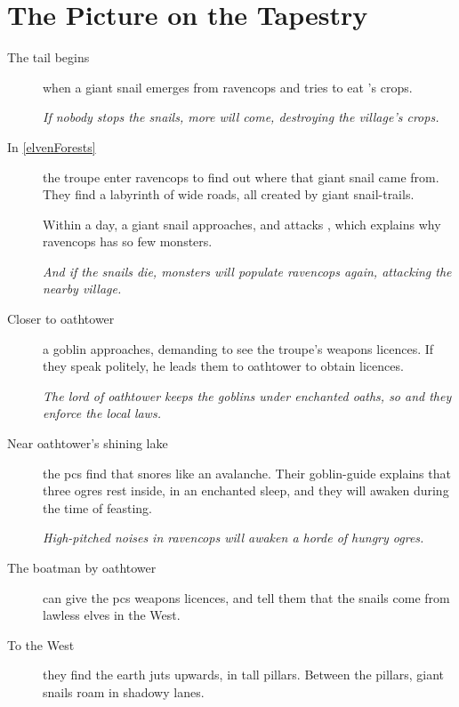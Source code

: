 \enchantedMap[b]

\section*{The Picture on the Tapestry}

\begin{multicols}{2}

\begin{description}
  \item[The tail begins]
  when a giant snail emerges from \gls{ravencops} and tries to eat 's crops.

  \textit{If nobody stops the snails, more will come, destroying the \gls{village}'s crops.}

  \item[In \autoref{elvenForests}]
  the troupe enter \gls{ravencops} to find out where that giant snail came from.
  They find a labyrinth of wide roads, all created by giant snail-trails.

  Within a day, a giant snail approaches, and attacks , which explains why \gls{ravencops} has so few monsters.

  \textit{And if the snails die, \glspl{monster} will populate \gls{ravencops} again, attacking the nearby \gls{village}.}

  \item[Closer to \gls{oathtower}]
  a goblin approaches, demanding to see the troupe's weapons licences.
  If they speak politely, he leads them to \gls{oathtower} to obtain licences.

  \textit{The lord of \gls{oathtower} keeps the goblins under enchanted oaths, so and they enforce the local laws.}

  \item[Near \gls{oathtower}'s shining lake]
  the \glspl{pc} find  that snores like an avalanche.
  Their goblin-guide explains that three \glspl{ogre} rest inside, in an enchanted sleep, and they will awaken during the time of feasting.

  \textit{High-pitched noises in \gls{ravencops} will awaken a horde of hungry \glspl{ogre}.}

  \item[The boatman by \gls{oathtower}]
  can give the \glspl{pc} weapons licences, and tell them that the snails come from lawless elves in the West.

  \item[To the West]
  they find the earth juts upwards, in tall pillars.
  Between the pillars, giant snails roam in shadowy lanes.


\end{description}
\end{multicols}
